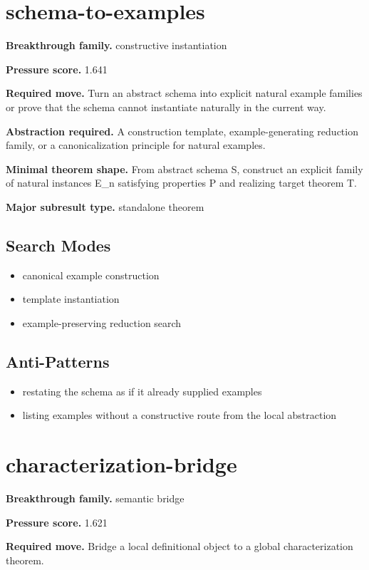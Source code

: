 \documentclass[11pt]{article}
\begin{document}
\section{schema-to-examples}
\textbf{Breakthrough family.} constructive instantiation

\textbf{Pressure score.} 1.641

\textbf{Required move.} Turn an abstract schema into explicit natural example families or prove that the schema cannot instantiate naturally in the current way.

\textbf{Abstraction required.} A construction template, example-generating reduction family, or a canonicalization principle for natural examples.

\textbf{Minimal theorem shape.} From abstract schema S, construct an explicit family of natural instances E\_n satisfying properties P and realizing target theorem T.

\textbf{Major subresult type.} standalone theorem

\subsection*{Search Modes}
\begin{itemize}[leftmargin=*,itemsep=0.2em]
\item canonical example construction
\item template instantiation
\item example-preserving reduction search
\end{itemize}
\subsection*{Anti-Patterns}
\begin{itemize}[leftmargin=*,itemsep=0.2em]
\item restating the schema as if it already supplied examples
\item listing examples without a constructive route from the local abstraction
\end{itemize}
\section{characterization-bridge}
\textbf{Breakthrough family.} semantic bridge

\textbf{Pressure score.} 1.621

\textbf{Required move.} Bridge a local definitional object to a global characterization theorem.
\end{document}
